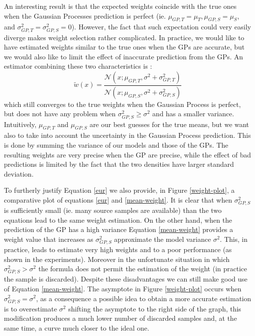     \noindent An interesting result is that the expected weights coincide with the true ones when the Gaussian Processes prediction
    is perfect (ie. $\mu_{GP,T} = \mu_{T}, \mu_{GP,S} = \mu_{S}$, and $\sigma^{2}_{GP,T} = \sigma^{2}_{GP,S} = 0$). However, the fact
    that such expectation could very easily diverge makes weight selection rather complicated. In practice, we would like to have
    estimated weights similar to the true ones when the GPs are accurate, but we would also like to limit the effect of inaccurate
    prediction from the GPs. An estimator combining these two characteristics is :
    \begin{equation}
      \tilde{w}(x) = \frac{\mathcal{N}(x; \mu_{GP,T}, \sigma^{2}+\sigma^{2}_{GP,T})}{\mathcal{N}(x; \mu_{GP,S}, \sigma^{2} + \sigma^{2}_{GP,S})}
      \label{eur}
    \end{equation}
    which still converges to the true weights when the Gaussian Process is perfect, but does not have any problem when $\sigma^{2}_{GP,S} \geq \sigma^{2}$ and has a
    smaller variance. Intuitively, $\mu_{GP,T}$ and $\mu_{GP,S}$ are our best guesses for the true means, but we want also
    to take into account the uncertainty in the Gaussian Process prediction. This is done by summing the variance of our models and
    those of the GPs. The resulting weights are very precise when the GP are precise, while the effect of bad predictions is limited
    by the fact that the two densities have larger standard deviation.\newline

    \noindent To furtherly justify Equation \ref{eur} we also provide, in Figure \ref{weight-plot}, a comparative plot of equations \ref{eur} and \ref{mean-weight}.
    It is clear that when $\sigma^{2}_{GP,S}$ is sufficiently small (ie. many source samples are available) than the two equations lead
    to the same weight estimation. On the other hand, when the prediction of the GP has a high variance Equation \ref{mean-weight} provides
    a weight value that increases as $\sigma^{2}_{GP,S}$ approximate the model variance $\sigma^{2}$. This, in practice, leads to
    estimate very high weights and to a poor performance (as shown in the experiments). Moreover in the unfortunate
    situation in which $\sigma^{2}_{GP,S} > \sigma^{2}$ the formula does not permit the estimation of the weight (in practice the
    sample is discarded).\newline
    Despite these disadvantages we can still make good use of Equation \ref{mean-weight}. The asymptote in Figure \ref{weight-plot}
    occurs when $\sigma_{GP,S}^{2} = \sigma^{2}$, as a consequence a possible idea to obtain a more accurate estimation is
    to overestimate $\sigma^{2}$ shifting the asymptote to the right side of the graph, this modification produces a much
    lower number of discarded samples and, at the same time, a curve much closer to the ideal one.

